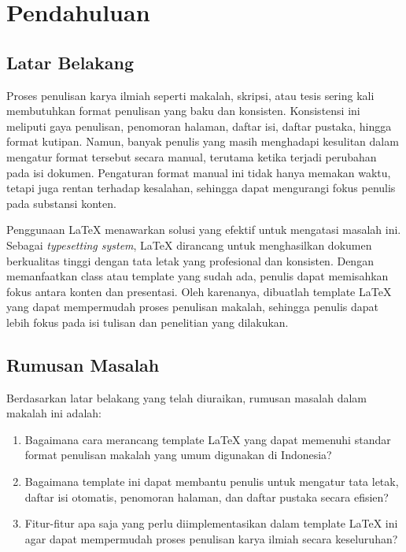 %
%
\chapter{Pendahuluan}


%
%
\section{Latar Belakang}

Proses penulisan karya ilmiah seperti makalah, skripsi, atau tesis sering kali membutuhkan format penulisan yang baku dan konsisten. Konsistensi ini meliputi gaya penulisan, penomoran halaman, daftar isi, daftar pustaka, hingga format kutipan. Namun, banyak penulis yang masih menghadapi kesulitan dalam mengatur format tersebut secara manual, terutama ketika terjadi perubahan pada isi dokumen. Pengaturan format manual ini tidak hanya memakan waktu, tetapi juga rentan terhadap kesalahan, sehingga dapat mengurangi fokus penulis pada substansi konten.

Penggunaan LaTeX menawarkan solusi yang efektif untuk mengatasi masalah ini. Sebagai \textit{typesetting system}, LaTeX dirancang untuk menghasilkan dokumen berkualitas tinggi dengan tata letak yang profesional dan konsisten. Dengan memanfaatkan class atau template yang sudah ada, penulis dapat memisahkan fokus antara konten dan presentasi. Oleh karenanya, dibuatlah template LaTeX yang dapat mempermudah proses penulisan makalah, sehingga penulis dapat lebih fokus pada isi tulisan dan penelitian yang dilakukan.

%
%
\section{Rumusan Masalah}

Berdasarkan latar belakang yang telah diuraikan, rumusan masalah dalam makalah ini adalah:

\begin{enumerate}
    \item Bagaimana cara merancang template LaTeX yang dapat memenuhi standar format penulisan makalah yang umum digunakan di Indonesia?
    \item Bagaimana template ini dapat membantu penulis untuk mengatur tata letak, daftar isi otomatis, penomoran halaman, dan daftar pustaka secara efisien?
    \item Fitur-fitur apa saja yang perlu diimplementasikan dalam template LaTeX ini agar dapat mempermudah proses penulisan karya ilmiah secara keseluruhan?
\end{enumerate}

